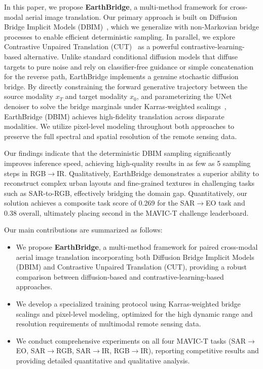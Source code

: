 In this paper, we propose \textbf{EarthBridge}, a multi-method framework for cross-modal aerial image translation. Our primary approach is built on Diffusion Bridge Implicit Models (DBIM)~\cite{zhengDiffusionBridgeImplicit2025}, which we generalize with non-Markovian bridge processes to enable efficient deterministic sampling. In parallel, we explore Contrastive Unpaired Translation (CUT)~\cite{parkContrastiveLearningUnpaired2020} as a powerful contrastive-learning-based alternative. Unlike standard conditional diffusion models that diffuse targets to pure noise and rely on classifier-free guidance or simple concatenation for the reverse path, EarthBridge implements a genuine stochastic diffusion bridge. By directly constraining the forward generative trajectory between the source modality $x_T$ and target modality $x_0$, and parameterizing the UNet denoiser to solve the bridge marginals under Karras-weighted scalings~\cite{karras2022elucidating}, EarthBridge (DBIM) achieves high-fidelity translation across disparate modalities. We utilize pixel-level modeling throughout both approaches to preserve the full spectral and spatial resolution of the remote sensing data.

Our findings indicate that the deterministic DBIM sampling significantly improves inference speed, achieving high-quality results in as few as 5 sampling steps in RGB$\rightarrow$IR. Qualitatively, EarthBridge demonstrates a superior ability to reconstruct complex urban layouts and fine-grained textures in challenging tasks such as SAR-to-RGB, effectively bridging the domain gap. Quantitatively, our solution achieves a composite task score of 0.269 for the SAR$\rightarrow$EO task and 0.38 overall, ultimately placing second in the MAVIC-T challenge leaderboard.

Our main contributions are summarized as follows:
\begin{itemize}[nosep, leftmargin=*]
    \item We propose \textbf{EarthBridge}, a multi-method framework for paired cross-modal aerial image translation incorporating both Diffusion Bridge Implicit Models (DBIM) and Contrastive Unpaired Translation (CUT), providing a robust comparison between diffusion-based and contrastive-learning-based approaches.
    \item We develop a specialized training protocol using Karras-weighted bridge scalings and pixel-level modeling, optimized for the high dynamic range and resolution requirements of multimodal remote sensing data.
    \item We conduct comprehensive experiments on all four MAVIC-T tasks (SAR$\rightarrow$EO, SAR$\rightarrow$RGB, SAR$\rightarrow$IR, RGB$\rightarrow$IR), reporting competitive results and providing detailed quantitative and qualitative analysis.
\end{itemize}
